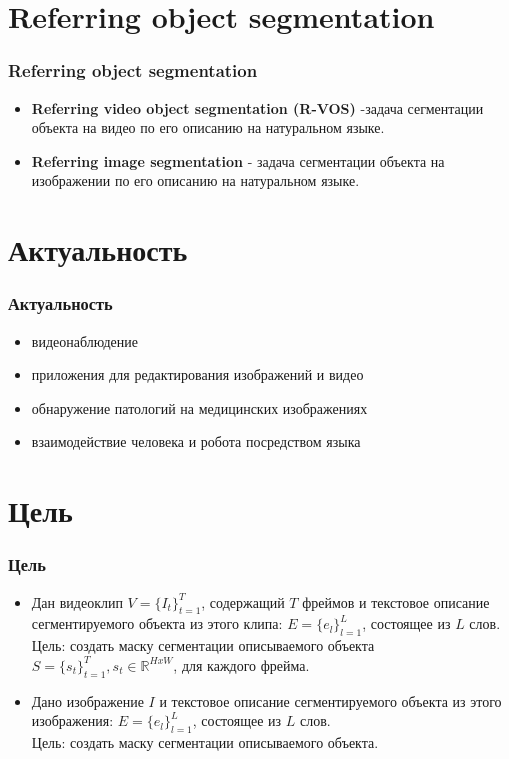 
\section{Referring object segmentation}

\begin{frame}
  \frametitle{Referring object segmentation}
  \begin{itemize}
    \item \textbf{Referring video object segmentation (R-VOS)} -задача сегментации объекта на видео по его описанию на натуральном языке.
    \item \textbf{Referring image segmentation} - задача сегментации объекта на изображении по его описанию на натуральном языке.
    
  \end{itemize}
\end{frame}


\section{Актуальность}

\begin{frame}
  \frametitle{Актуальность}
  \begin{itemize}
    \item видеонаблюдение 
    \item приложения для редактирования изображений и видео 
    \item обнаружение патологий на медицинских изображениях
    \item взаимодействие человека и робота посредством языка
  \end{itemize}
  
\end{frame}


\section{Цель}
\begin{frame}
    \frametitle{Цель}
    \begin{itemize}
        \item Дан видеоклип \(V=\{I_t\}_{t=1}^{T}\), содержащий \(T\) фреймов и
        текстовое описание сегментируемого объекта из этого клипа: \(E=\{e_l\}_{l=1}^L\), состоящее из \(L\) слов. \\
        Цель: создать маску сегментации описываемого объекта 
        \(S=\{s_t\}_{t=1}^T, s_t \in \mathbb{R}^{HxW}\), для каждого фрейма. 
        \item Дано изображение \(I\) и текстовое описание сегментируемого объекта из этого изображения: \(E=\{e_l\}_{l=1}^L\), состоящее из \(L\) слов. \\Цель: создать маску сегментации описываемого объекта.

    \end{itemize}
\end{frame}

